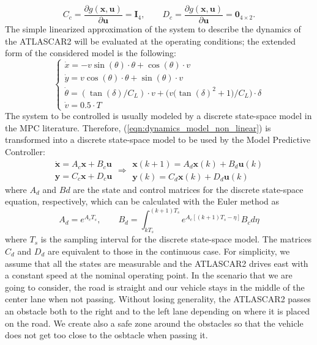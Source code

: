 \documentclass[conference, 11pt]{IEEEtran}
\begin{document}
\[
C_c=\frac{\partial g(\textbf{x},\textbf{u})}{\partial \textbf{u}} = \textbf{I}_4, 
\qquad
D_c=\frac{\partial g(\textbf{x},\textbf{u})}{\partial \textbf{u}}=\textbf{0}_{4\times2}. 
\]
The simple linearized approximation of the system to describe the dynamics of the ATLASCAR2 will be evaluated at the operating conditions; the extended form of the considered model is the following:
\begin{equation*}
	\label{eqn:dynamics_model_obstacle_avoidance_linearized}
	\left \{ \begin{array}{llll}
	\dot{x} = -v\sin(\theta)\cdot\theta+\cos(\theta)\cdot v\\
	\dot{y} = v\cos(\theta)\cdot\theta+\sin(\theta)\cdot v\\
	\dot{\theta} =(\tan(\delta)/C_L)\cdot v+ \bigg(v\bigg(\tan(\delta)^2+1\bigg)/C_L\bigg)\cdot \delta\\
	\dot{v} =0.5\cdot T
	\end{array} 
	\right .
\end{equation*}
The system to be controlled is usually modeled by a discrete state-space model in the MPC literature. Therefore, (\ref{eqn:dynamics_model_non_linear})
is transformed into a discrete state-space model to be used by the Model Predictive Controller:
\begin{equation*}
\label{eqn:dynamics_ss_obstacle_avoidance_dis}
	\begin{array}{ll}
	\dot{\textbf{x}} =A_c \textbf{x}+ B_c \textbf{u}\\
	\textbf{y} =C_c \textbf{x} + D_c \textbf{u}
	\end{array}
	\Rightarrow
	\begin{array}{rr}
	{\textbf{x}}(k+1) =A_d \textbf{x}(k)+ B_d \textbf{u}(k)\\
	\textbf{y}(k) =C_d \textbf{x}(k) + D_d \textbf{u}(k)
	\end{array}
\end{equation*}
where $A_d$ and $B d$ are the state and control matrices for the discrete state-space equation, respectively, which can be calculated with the Euler method as
\[
A_d = e^{A_cT_s},\qquad B_d = \int_{kT_s}^{(k+1)T_s} e^{A_c[(k+1)T_s-\eta]}B_c d\eta
\]
where $T_s$ is the sampling interval for the discrete state-space model. The matrices $C_d$ and $D_d$ are equivalent to those in the continuous case. For simplicity, we assume that all the states are measurable and the ATLASCAR2 drives east with a constant speed at the nominal operating point. In the scenario that we are going to consider, the road is straight and our vehicle stays in the middle of the center lane when not passing. Without losing generality, the ATLASCAR2 passes an obstacle both to the right and to the left lane depending on where it is placed on the road. We create also a safe zone around the obstacles so that the vehicle does not get too close to the osbtacle when passing it.
\end{document}
